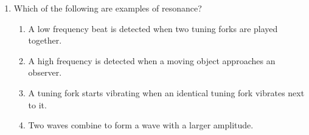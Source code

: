 \documentclass{../../../oss-classkick}
\begin{document}
\begin{multicols}{2}
\begin{enumerate}[leftmargin=18pt,resume]
  \item Which of the following are examples of resonance?
    \label{multi-last}
    \begin{enumerate}[nosep,leftmargin=18pt,label=(\Alph*)]
    \item A low frequency beat is detected when two tuning forks are played
      together.
    \item A high frequency is detected when a moving object approaches an
      observer.
    \item A tuning fork starts vibrating when an identical tuning fork vibrates
      next to it.
    \item Two waves combine to form a wave with a larger amplitude.
    \end{enumerate}
  \end{enumerate}
\end{multicols}
\newpage


\genfreedirections
\end{document}
